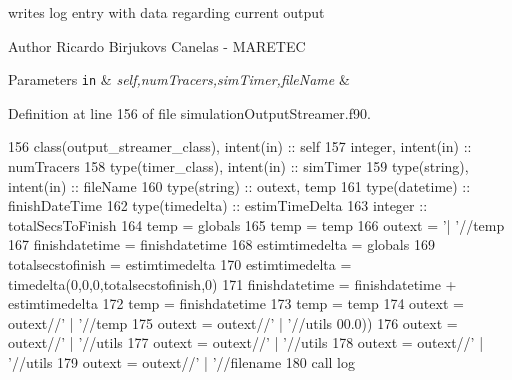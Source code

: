 writes log entry with data regarding current output 

\begin{DoxyAuthor}{Author}
Ricardo Birjukovs Canelas -\/ M\+A\+R\+E\+T\+EC 
\end{DoxyAuthor}

\begin{DoxyParams}[1]{Parameters}
\mbox{\tt in}  & {\em self,num\+Tracers,sim\+Timer,file\+Name} & \\
\hline
\end{DoxyParams}


Definition at line 156 of file simulation\+Output\+Streamer.\+f90.


\begin{DoxyCode}
156     \textcolor{keywordtype}{class}(output\_streamer\_class), \textcolor{keywordtype}{intent(in)} :: self
157     \textcolor{keywordtype}{integer}, \textcolor{keywordtype}{intent(in)} :: numTracers
158     \textcolor{keywordtype}{type}(timer\_class), \textcolor{keywordtype}{intent(in)} :: simTimer
159     \textcolor{keywordtype}{type}(string), \textcolor{keywordtype}{intent(in)} :: fileName
160     \textcolor{keywordtype}{type}(string) :: outext, temp
161     \textcolor{keywordtype}{type}(datetime) :: finishDateTime
162     \textcolor{keywordtype}{type}(timedelta) :: estimTimeDelta
163     \textcolor{keywordtype}{integer} :: totalSecsToFinish
164     temp = globals%
165     temp = temp%
166     outext = \textcolor{stringliteral}{'| '}//temp
167     finishdatetime = finishdatetime%
168     estimtimedelta = globals%
169     totalsecstofinish = estimtimedelta%
170     estimtimedelta = timedelta(0,0,0,totalsecstofinish,0)
171     finishdatetime = finishdatetime + estimtimedelta
172     temp = finishdatetime%
173     temp = temp%
174     outext = outext//\textcolor{stringliteral}{' | '}//temp
175     outext = outext//\textcolor{stringliteral}{' | '}//utils%
      00.0))
176     outext = outext//\textcolor{stringliteral}{' | '}//utils%
177     outext = outext//\textcolor{stringliteral}{' | '}//utils%
178     outext = outext//\textcolor{stringliteral}{' | '}//utils%
179     outext = outext//\textcolor{stringliteral}{' | '}//filename
180     \textcolor{keyword}{call }log%
\end{DoxyCode}
\mbox{\label{namespacesimulationoutputstreamer__mod_a689f65c821b78d46b142653214338b85}} 

